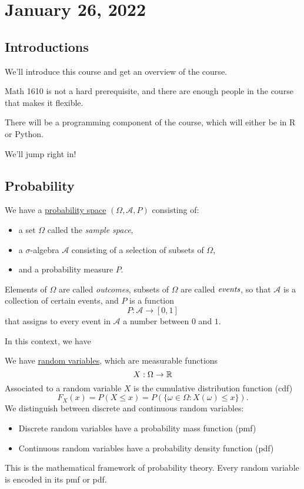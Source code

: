 \section{January 26, 2022}
\subsection{Introductions}
We'll introduce this course and get an overview of the course.

Math 1610 is not a hard prerequisite, and there are enough people in the course that makes it flexible.

There will be a programming component of the course, which will either be in \textsf{R} or \textsf{Python}.

We'll jump right in!

\subsection{Probability}

\begin{definition}
    We have a \ul{probability space} $(\Omega, \mathcal{A}, P)$ consisting of:
    \begin{itemize}
        \item a set $\Omega$ called the \emph{sample space},
        \item a $\sigma$-algebra $\mathcal{A}$ consisting of a selection of subsets of $\Omega$,
        \item and a probability measure $P$.
    \end{itemize}
    Elements of $\Omega$ are called \emph{outcomes}, subsets of $\Omega$ are called $\emph{events}$, so that $\mathcal{A}$ is a collection of certain events, and $P$ is a function
    \[P : \mathcal{A} \to [0, 1]\]
    that assigns to every event in $\mathcal{A}$ a number between $0$ and $1$.
\end{definition}

In this context, we have
\begin{definition}
    We have \ul{random variables}, which are measurable functions
    \[X : \Omega \to \mathbb R\]
    Associated to a random variable $X$ is the cumulative distribution function (\textsf{cdf})
    \[F_X(x) = P(X \leq x) = P(\{\omega \in \Omega : X(\omega) \leq x\}).\]
    We distinguish between discrete and continuous random variables:
    \begin{itemize}
        \item Discrete random variables have a probability mass function (\textsf{pmf})
        \item Continuous random variables have a probability density function (\textsf{pdf})
    \end{itemize}
    This is the mathematical framework of probability theory. Every random variable is encoded in its \textsf{pmf} or \textsf{pdf}.
\end{definition}

